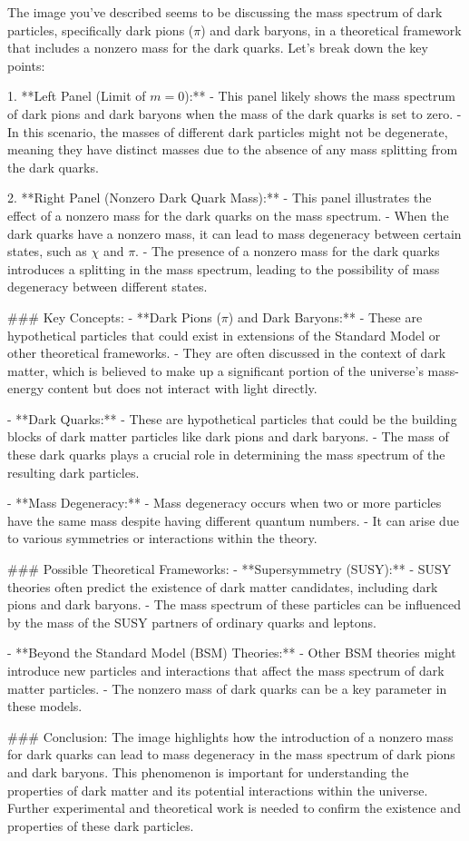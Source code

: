 The image you've described seems to be discussing the mass spectrum of dark particles, specifically dark pions (\(\pi\)) and dark baryons, in a theoretical framework that includes a nonzero mass for the dark quarks. Let's break down the key points:

1. **Left Panel (Limit of \(m = 0\)):**
   - This panel likely shows the mass spectrum of dark pions and dark baryons when the mass of the dark quarks is set to zero.
   - In this scenario, the masses of different dark particles might not be degenerate, meaning they have distinct masses due to the absence of any mass splitting from the dark quarks.

2. **Right Panel (Nonzero Dark Quark Mass):**
   - This panel illustrates the effect of a nonzero mass for the dark quarks on the mass spectrum.
   - When the dark quarks have a nonzero mass, it can lead to mass degeneracy between certain states, such as \(\chi\) and \(\pi\).
   - The presence of a nonzero mass for the dark quarks introduces a splitting in the mass spectrum, leading to the possibility of mass degeneracy between different states.

### Key Concepts:
- **Dark Pions (\(\pi\)) and Dark Baryons:**
  - These are hypothetical particles that could exist in extensions of the Standard Model or other theoretical frameworks.
  - They are often discussed in the context of dark matter, which is believed to make up a significant portion of the universe's mass-energy content but does not interact with light directly.

- **Dark Quarks:**
  - These are hypothetical particles that could be the building blocks of dark matter particles like dark pions and dark baryons.
  - The mass of these dark quarks plays a crucial role in determining the mass spectrum of the resulting dark particles.

- **Mass Degeneracy:**
  - Mass degeneracy occurs when two or more particles have the same mass despite having different quantum numbers.
  - It can arise due to various symmetries or interactions within the theory.

### Possible Theoretical Frameworks:
- **Supersymmetry (SUSY):**
  - SUSY theories often predict the existence of dark matter candidates, including dark pions and dark baryons.
  - The mass spectrum of these particles can be influenced by the mass of the SUSY partners of ordinary quarks and leptons.

- **Beyond the Standard Model (BSM) Theories:**
  - Other BSM theories might introduce new particles and interactions that affect the mass spectrum of dark matter particles.
  - The nonzero mass of dark quarks can be a key parameter in these models.

### Conclusion:
The image highlights how the introduction of a nonzero mass for dark quarks can lead to mass degeneracy in the mass spectrum of dark pions and dark baryons. This phenomenon is important for understanding the properties of dark matter and its potential interactions within the universe. Further experimental and theoretical work is needed to confirm the existence and properties of these dark particles.